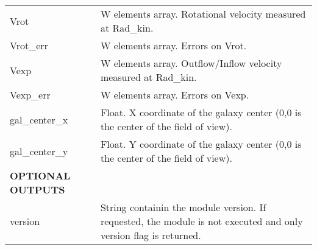 \begin{center}
\begin{longtable}{p{2.7cm}| p{11.1cm}}
%
Vrot & W elements array. Rotational velocity measured at Rad\_kin. \\ 
%
Vrot\_err & W elements array. Errors on Vrot. \\ 
%
Vexp & W elements array. Outflow/Inflow velocity measured at Rad\_kin. \\ 
%
Vexp\_err & W elements array. Errors on Vexp. \\ 
%
gal\_center\_x & Float. X coordinate of the galaxy center (0,0 is the center of the field of view). \\  
%
gal\_center\_y & Float. Y coordinate of the galaxy center (0,0 is the center of the field of view).\\ 
\hline
{\bf OPTIONAL OUTPUTS}  & \\
\hline
 version  & String containin the module version. If requested, the module is not executed 
           and only version flag is returned.\\
\hline
\hline
\end{longtable}
\end{center}
